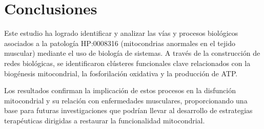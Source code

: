 \section{Conclusiones}

Este estudio ha logrado identificar y analizar las vías y procesos biológicos asociados a la patología HP:0008316 (mitocondrias anormales en el tejido muscular) mediante el uso de biología de sistemas. A través de la construcción de redes biológicas, se identificaron clústeres funcionales clave relacionados con la biogénesis mitocondrial, la fosforilación oxidativa y la producción de ATP.

Los resultados confirman la implicación de estos procesos en la disfunción mitocondrial y su relación con enfermedades musculares, proporcionando una base para futuras investigaciones que podrían llevar al desarrollo de estrategias terapéuticas dirigidas a restaurar la funcionalidad mitocondrial.






